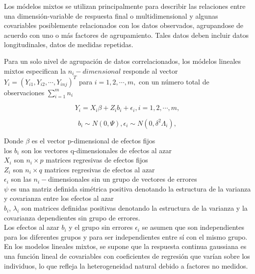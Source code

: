	Los m\'odelos mixtos se utilizan principalmente para describir las relaciones entre una dimensi\'on-variable de respuesta final o multidimensional y algunas covariables posiblemente relacionados con los datos observados, agrupandose de acuerdo con uno o m\'as factores de agrupamiento. Tales datos deben incluir datos longitudinales, datos de medidas repetidas.\citet{zhang} 
	 
	 Para un solo nivel de agrupaci\'on de datos correlacionados, los m\'odelos lineales mixtos especifican la $n_{i}-dimensional$ responde al vector $Y_{i}=(Y_{i1},Y_{i2},\cdots ,Y_{inj})^{T}$ para $i=1,2,\cdots,m,$ con un n\'umero total de observaciones $\sum_{i=1}^m n_{i}$ 
	
	\begin{equation}
	 Y_{i}=X_{i}\beta +Z_{i}b_{i}+\epsilon_{i},   i=1,2,\cdots,m,	
	\end{equation}
	
	 \begin{equation}
	 b_{i} \sim N(0,\Psi),    \epsilon_{i} \sim N(0,\delta^{2}\Lambda_{i}),
	 \end{equation}

\noindent
Donde $\beta$ es el vector p-dimensional de efectos fijos \\
los $b_{i}$ son los vectores q-dimensionales de efectos al azar \\
$X_{i}$ son $n_{i} \times p$ matrices regresivas de efectos fijos \\
$Z_{i}$ son $n_{i} \times q$ matrices regresivas de efectos al azar \\
$\epsilon_{i}$ son las $n_{i}-$dimensionales sin un grupo de vectores de errores \\
$\psi$ es una matriz definida sim\'etrica positiva denotando la estructura de la varianza y covarianza entre los efectos al azar \\
$b_{i}$, $\lambda_{i}$ son matrices definidas positivas denotando la estructura de la varianza y la covarianza dependientes sin grupo de errores.\\ 

Los efectos al azar $b_{i}$ y el grupo sin errores $\epsilon_{i}$ se asumen que son independientes para los diferentes grupos y para ser independientes entre s\'i con el mismo grupo. En los modelos lineales mixtos, se supone que la respuesta continua gaussiana es una funci\'on lineal de covariables con coeficientes de regresi\'on que var\'ian sobre los individuos, lo que refleja la heterogeneidad natural debido a factores no medidos. \citet{zhang} 

